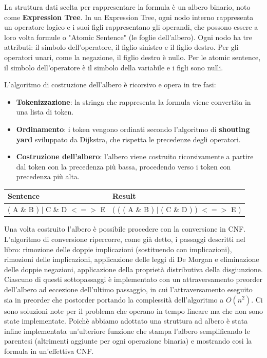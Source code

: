 \documentclass{article} %
\begin{document}
La struttura dati scelta per rappresentare la formula è un albero binario, noto come \textbf{Expression Tree}. In un Expression Tree, ogni nodo interno rappresenta un operatore logico e i suoi figli rappresentano gli operandi, che possono essere a loro volta formule o "Atomic Sentence" (le foglie dell'albero). Ogni nodo ha tre attributi: il simbolo dell'operatore, il figlio sinistro e il figlio destro. Per gli operatori unari, come la negazione, il figlio destro è nullo. Per le atomic sentence, il simbolo dell'operatore è il simbolo della variabile e i figli sono nulli.

L'algoritmo di costruzione dell'albero è ricorsivo e opera in tre fasi:

\begin{itemize}
    \item \textbf{Tokenizzazione}: la stringa che rappresenta la formula viene convertita in una lista di token.
    \item \textbf{Ordinamento}: i token vengono ordinati secondo l'algoritmo di \textbf{shouting yard} sviluppato da Dijkstra, che rispetta le precedenze degli operatori.
    \item \textbf{Costruzione dell'albero}: l'albero viene costruito ricorsivamente a partire dal token con la precedenza più bassa, procedendo verso i token con precedenza più alta.
\end{itemize}

\vspace{0.5cm}

\begin{tabular}{|p{4.5cm}|p{5.5cm}|}
    \textbf{Sentence} & \textbf{Result} \\ \hline
    ( A \& B ) $|$ C \& D $<=>$ E & ( ( ( A \& B ) $|$ ( C \& D ) ) $<=>$ E ) \\
\end{tabular}

\vspace{0.5cm}

\noindent Una volta costruito l'albero è possibile procedere con la conversione in CNF. L'algoritmo di conversione ripercorre, come già detto, i passaggi descritti nel libro: rimozione delle doppie implicazioni (sostituendo con implicazioni), rimozioni delle implicazioni, applicazione delle leggi di De Morgan e eliminazione delle doppie negazioni, applicazione della proprietà distributiva della disgiunzione.
Ciascuno di questi sottopassaggi è implementato con un attraversamento preorder dell'albero ad eccezione dell'ultimo passaggio, in cui l'attraversamento eseguito sia in preorder che postorder portando la complessità dell'algoritmo a $O(n^2)$. Ci sono soluzioni note per il problema che operano in tempo lineare ma che non sono state implementate.
Poichè abbiamo adottato una struttura ad albero è stata infine implementata un'ulteriore funzione che stampa l'albero semplificando le parentesi (altrimenti aggiunte per ogni operazione binaria) e mostrando così la formula in un'effettiva CNF.
\end{document}
